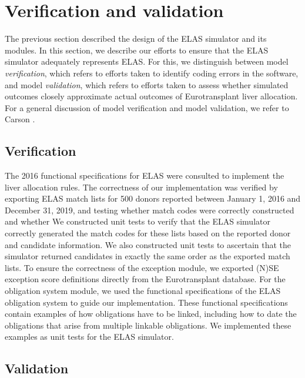 \documentclass[11pt,twoside,]{book}
\begin{document}
\section{Verification and validation}\label{sec:elasvv}

The previous section described the design of the ELAS simulator and
its modules. In
this section, we describe our efforts to ensure that the ELAS simulator
adequately represents ELAS. For this, we distinguish between model
\emph{verification}, which refers to efforts taken to identify coding errors in the
software, and model \emph{validation}, which refers to efforts taken to assess whether
simulated outcomes closely approximate actual outcomes of Eurotransplant
liver allocation. For a general discussion of model verification and model
validation, we refer to Carson \citep{carsonVerificationValidationConsultants1989}.

\subsection{Verification}\label{sec:elasverification}

The 2016 functional specifications for ELAS were consulted to implement the
liver allocation rules. The correctness of our implementation was verified by
exporting ELAS match lists for 500 donors reported between January 1, 2016
and December 31, 2019, and testing whether match codes were correctly constructed
and whether We constructed unit tests to verify that
the ELAS simulator correctly generated the match codes for these lists based
on the reported donor and candidate information. We also constructed unit tests to
ascertain that the simulator returned candidates in exactly the same order as the exported match lists. To ensure the correctness of the exception module, we exported (N)SE
exception score definitions directly from the Eurotransplant database.
For the obligation system module, we used the functional specifications of
the ELAS obligation system to guide our implementation. These functional
specifications contain examples of how obligations have to be linked, including how to date the obligations that arise from multiple linkable
obligations. We implemented these examples as unit tests for the ELAS
simulator.

\subsection{Validation}\label{sec:elasvalidation}
\end{document}
